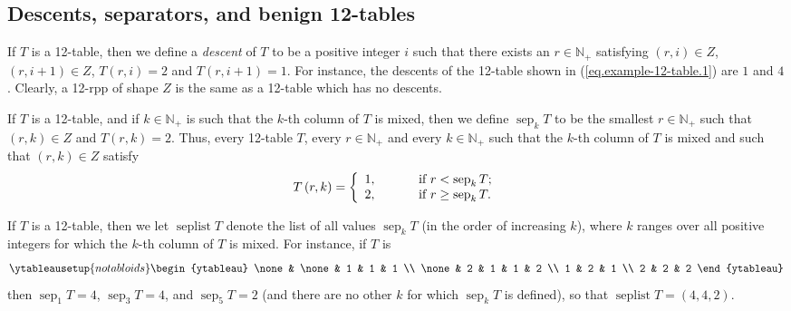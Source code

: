 \documentclass[numbers=enddot,12pt,final,onecolumn,notitlepage]{scrartcl}%
\theoremstyle{definition}
\begin{document}
\subsection{\label{subsection:benign}Descents, separators, and benign 12-tables}

If $T$ is a 12-table, then we define a \textit{descent} of $T$ to be a
positive integer $i$ such that there exists an $r\in\mathbb{N}_{+}$ satisfying
$\left(  r,i\right)  \in Z$, $\left(  r,i+1\right)  \in Z$, $T\left(
r,i\right)  =2$ and $T\left(  r,i+1\right)  =1$. For instance,
the descents of the 12-table shown in (\ref{eq.example-12-table.1})
are $1$ and $4$. Clearly, a 12-rpp of shape $Z$ is the same as a 12-table which has no
descents.

If $T$ is a 12-table, and if $k\in\mathbb{N}_{+}$ is such that the $k$-th
column of $T$ is mixed, then we define $\operatorname*{sep}\nolimits_{k}T$ to
be the smallest $r\in\mathbb{N}_{+}$ such that $\left(  r,k\right)  \in Z$ and
$T\left(  r,k\right)  =2$. Thus, every 12-table $T$, every
$r\in\mathbb{N}_{+}$ and every $k\in\mathbb{N}_{+}$ such that the $k$-th
column of $T$ is mixed and such that $\left(  r,k\right)  \in Z$ satisfy%
\begin{equation}
T\left(  r,k\right)  =\left\{
\begin{array}
[c]{l}%
1,\ \ \ \ \ \ \ \ \ \ \text{if }r<\operatorname*{sep}\nolimits_{k}T;\\
2,\ \ \ \ \ \ \ \ \ \ \text{if }r\geq\operatorname*{sep}\nolimits_{k}T.
\end{array}
\right.  \label{pf.lem.BK.Tsep}%
\end{equation}

If $T$ is a 12-table, then we let $\operatorname*{seplist}T$ denote the list
of all values $\operatorname*{sep}\nolimits_{k}T$ (in the order of increasing
$k$), where $k$ ranges over all positive integers for which the $k$-th column
of $T$ is mixed. For instance, if $T$ is
\[
%
\ytableausetup{notabloids}
\begin{ytableau}
\none& \none& 1 & 1 & 1 \\
\none& 2 & 1 & 1 & 2 \\
1 & 2 & 1 \\
2 & 2 & 2
\end{ytableau}%
\]
then $\operatorname*{sep}\nolimits_{1}T=4$, $\operatorname*{sep}\nolimits_{3}T=4$, and
$\operatorname*{sep}\nolimits_{5}T=2$ (and there are no other $k$ for which $\operatorname*{sep}\nolimits_{k}T$ is defined), so that $\operatorname*{seplist}T=\left(  4,4,2\right)  $.
\end{document}
